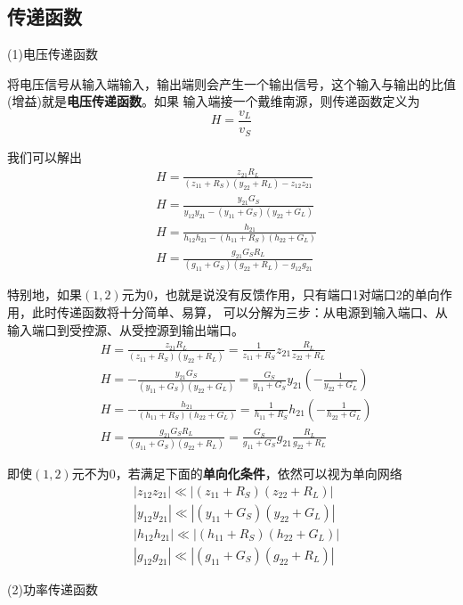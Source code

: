     \subsection{传递函数}
    \par (1)电压传递函数
    \par 将电压信号从输入端输入，输出端则会产生一个输出信号，这个输入与输出的比值(增益)就是\textbf{电压传递函数}。如果
    输入端接一个戴维南源，则传递函数定义为
    \[
    H=\frac{v_L}{v_S}    
    \]
    \par 我们可以解出
    \begin{align*}
        &H=\frac{z_{21}R_L}{(z_{11}+R_S)(y_{22}+R_L)-z_{12}z_{21}}\\
        &H=\frac{y_{21}G_S}{y_{12}y_{21}-(y_{11}+G_S)(y_{22}+G_L)}\\
        &H=\frac{h_{21}}{h_{12}h_{21}-(h_{11}+R_S)(h_{22}+G_L)}\\
        &H=\frac{g_{21}G_SR_L}{(g_{11}+G_S)(g_{22}+R_L)-g_{12}g_{21}}
    \end{align*}
    \par 特别地，如果$(1,2)$元为0，也就是说没有反馈作用，只有端口1对端口2的单向作用，此时传递函数将十分简单、易算，
    可以分解为三步：从电源到输入端口、从输入端口到受控源、从受控源到输出端口。
    \begin{align*}
        &H=\frac{z_{21}R_L}{(z_{11}+R_S)(y_{22}+R_L)}=\frac{1}{z_{11}+R_S}z_{21}\frac{R_L}{z_{22}+R_L}\\
        &H=-\frac{y_{21}G_S}{(y_{11}+G_S)(y_{22}+G_L)}=\frac{G_S}{y_{11}+G_S}y_{21}\left(-\frac{1}{y_{22}+G_L}\right)\\
        &H=-\frac{h_{21}}{(h_{11}+R_S)(h_{22}+G_L)}=\frac{1}{h_{11}+R_S}h_{21}\left(-\frac{1}{h_{22}+G_L}\right)\\
        &H=\frac{g_{21}G_SR_L}{(g_{11}+G_S)(g_{22}+R_L)}=\frac{G_S}{g_{11}+G_S}g_{21}\frac{R_L}{g_{22}+R_{L}}
    \end{align*}
    \par 即使$(1,2)$元不为0，若满足下面的\textbf{单向化条件}，依然可以视为单向网络
    \begin{align*}
        &|z_{12}z_{21}|\ll|(z_{11}+R_S)(z_{22}+R_L)|\\
        &|y_{12}y_{21}|\ll|(y_{11}+G_S)(y_{22}+G_L)|\\
        &|h_{12}h_{21}|\ll|(h_{11}+R_S)(h_{22}+G_L)|\\
        &|g_{12}g_{21}|\ll|(g_{11}+G_S)(g_{22}+R_L)|
    \end{align*}
    \par (2)功率传递函数
